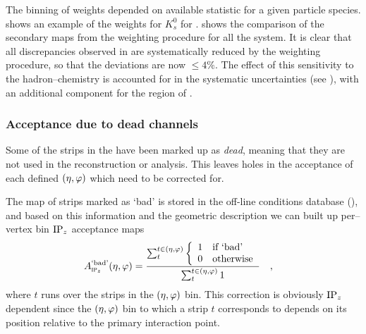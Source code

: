 The binning of weights depended on available statistic for a given
particle species.   shows an example of the
weights for $K^{0}_{s}$ for
\PbPbCol{}.  shows the comparison of
the secondary maps from the weighting procedure for all the system. It
is clear that all discrepancies observed in
 are systematically reduced by the weighting
procedure, so that the deviations are now $\le4\%$.
The effect of this sensitivity to the hadron--chemistry is accounted
for in the systematic uncertainties (see
), with an additional component for the
region of . 



\subsubsection{Acceptance due to dead channels}

Some of the strips in the \FMD{} have been marked up as \emph{dead},
meaning that they are not used in the reconstruction or analysis.
This leaves holes in the acceptance of each defined $(\eta,\varphi)$ which
need to be corrected for.

The map of strips marked as `bad' is stored in the off-line conditions
database (\OCDB{}), and based on this information and the geometric
description we can built up per--vertex bin $\IPz$ acceptance maps
\begin{align}
  \label{eq:dead_channels} 
  \DeadCh{} &= 
  \frac{\sum_t^{t\in\etaphi}\left\{\begin{array}{cl}
        1 & \text{if `bad'}\\
        0 & \text{otherwise}
      \end{array}\right.}{\sum_t^{t\in\etaphi} 1}\quad,
\end{align}
where $t$ runs over the strips in the $(\eta,\varphi)$ bin.  This correction
is obviously $\IPz$ dependent since the $(\eta,\varphi)$ bin to which a strip $t$
corresponds to depends on its position relative to the primary
interaction point. 

